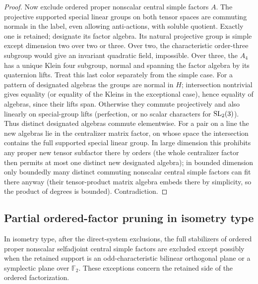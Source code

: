 \begin{proof}
Now exclude ordered proper nonscalar central simple factors \(A\). The projective supported special linear groups on both tensor spaces are commuting normals in the label, even allowing anti-actions, with soluble quotient. Exactly one is retained; designate its factor algebra. Its natural projective group is simple except dimension two over two or three. Over two, the characteristic order-three subgroup would give an invariant quadratic field, impossible. Over three, the \(A_4\) has a unique Klein four subgroup, normal and spanning the factor algebra by its quaternion lifts. Treat this last color separately from the simple case. For a pattern of designated algebras the groups are normal in \(H\); intersection nontrivial gives equality (or equality of the Kleins in the exceptional case), hence equality of algebras, since their lifts span. Otherwise they commute projectively and also linearly on special-group lifts (perfection, or no scalar characters for \({\rm SL}_2(3)\)). Thus distinct designated algebras commute elementwise. For a pair on a line the new algebras lie in the centralizer matrix factor, on whose space the intersection contains the full supported special linear group. In large dimension this prohibits any proper new tensor subfactor there by orders (the whole centralizer factor then permits at most one distinct new designated algebra); in bounded dimension only boundedly many distinct commuting nonscalar central simple factors can fit there anyway (their tensor-product matrix algebra embeds there by simplicity, so the product of degrees is bounded). Contradiction.
\end{proof}

\subsection{Partial ordered-factor pruning in isometry type}

\begin{proposition}\label{c:partial-isometry-factors}
In isometry type, after the direct-system exclusions, the full stabilizers of ordered proper nonscalar selfadjoint central simple factors are excluded except possibly when the retained support is an odd-characteristic bilinear orthogonal plane or a symplectic plane over \(\mathbb F_2\). These exceptions concern the retained side of the ordered factorization.
\end{proposition}

